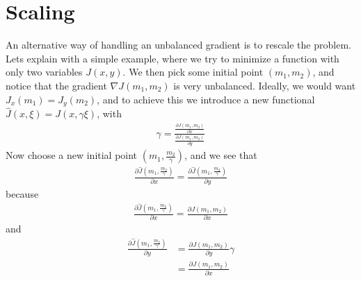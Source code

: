 \documentclass[11pt,a4paper]{article}
\begin{document}
\section{Scaling}
An alternative way of handling an unbalanced gradient is to rescale the problem. Lets explain with a simple example, where we try to minimize a function with only two variables $J(x,y)$. We then pick some initial point $(m_1,m_2)$, and notice that the gradient $\nabla J(m_1,m_2)$ is very unbalanced. Ideally, we would want $J_x(m_1)=J_y(m_2)$, and to achieve this we introduce a new functional $\hat{J}(x,\xi)=J(x,\gamma\xi)$, with 
\begin{align*}
\gamma = \frac{\frac{\partial J(m_1,m_2)}{\partial x}}{\frac{\partial J(m_1,m_2)}{\partial y}}
\end{align*} 
Now choose a new initial point $(m_1,\frac{m_2}{\gamma})$, and we see that 
\begin{align*}
\frac{\partial \hat{J}(m_1,\frac{m_2}{\gamma})}{\partial x}=\frac{\partial\hat{J}(m_1,\frac{m_2}{\gamma})}{\partial y}
\end{align*}
because
\begin{align*}
\frac{\partial \hat{J}(m_1,\frac{m_2}{\gamma})}{\partial x} = \frac{\partial J(m_1,m_2)}{\partial x}
\end{align*}
and
\begin{align*}
\frac{\partial\hat{J}(m_1,\frac{m_2}{\gamma})}{\partial y} & = \frac{\partial J(m_1,m_2)}{\partial y}\gamma \\
&=\frac{\partial J(m_1,m_2)}{\partial x}
\end{align*}
\end{document}
